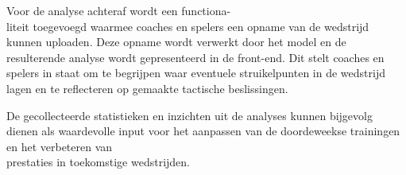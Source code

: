 Voor de analyse achteraf wordt een functiona-\\liteit toegevoegd waarmee coaches en spelers een opname van de wedstrijd kunnen uploaden. Deze opname wordt verwerkt door het model en de resulterende analyse wordt gepresenteerd in de front-end. Dit stelt coaches en spelers in staat om te begrijpen waar eventuele struikelpunten in de wedstrijd lagen en te reflecteren op gemaakte tactische beslissingen. 

De gecollecteerde statistieken en inzichten uit de analyses kunnen bijgevolg dienen als waardevolle input voor het aanpassen van de doordeweekse trainingen en het verbeteren van \\prestaties in toekomstige wedstrijden.


